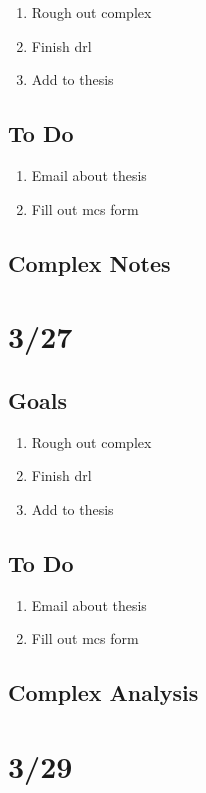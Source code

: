 \documentclass[11pt]{article}
\theoremstyle{remark}
\begin{document}
\begin{enumerate}
	\item Rough out complex
	\item Finish drl
	\item Add to thesis
\end{enumerate}

\subsection{To Do}

\begin{enumerate}
	\item Email about thesis
	\item Fill out mcs form
\end{enumerate}

\subsection{Complex Notes}

\section{3/27}

\subsection{Goals}

\begin{enumerate}
	\item Rough out complex
	\item Finish drl
	\item Add to thesis
\end{enumerate}

\subsection{To Do}

\begin{enumerate}
	\item Email about thesis
	\item Fill out mcs form
\end{enumerate}

\subsection{Complex Analysis}


\section{3/29}
\end{document}
